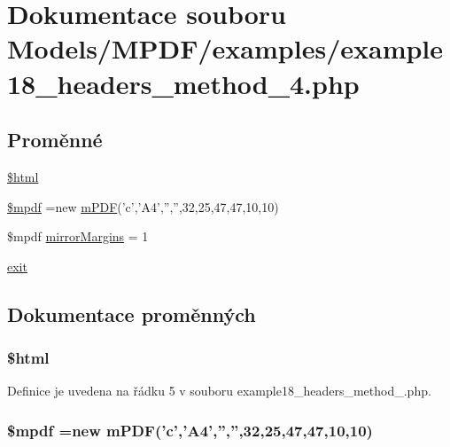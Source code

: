 \hypertarget{example18__headers__method__4_8php}{\section{Dokumentace souboru Models/\-M\-P\-D\-F/examples/example18\-\_\-headers\-\_\-method\-\_\-4.php}
\label{example18__headers__method__4_8php}
}
\subsection*{Proměnné}
\begin{DoxyCompactItemize}
\item 
\hyperlink{example18__headers__method__4_8php_a6f96e7fc92441776c9d1cd3386663b40}{\$html}
\item 
\hyperlink{example18__headers__method__4_8php_ad028f81910d6cbab9b184d2214b3a8f8}{\$mpdf} =new \hyperlink{classm_p_d_f}{m\-P\-D\-F}('c','A4','','',32,25,47,47,10,10)
\item 
\$mpdf \hyperlink{example18__headers__method__4_8php_a24c284cb7774410f65953584ea1fd9c1}{mirror\-Margins} = 1
\item 
\hyperlink{example18__headers__method__4_8php_a6733eb5f605d09eaede9845835d71c4e}{exit}
\end{DoxyCompactItemize}


\subsection{Dokumentace proměnných}
\hypertarget{example18__headers__method__4_8php_a6f96e7fc92441776c9d1cd3386663b40}{
\subsubsection[{\$html}]{\setlength{\rightskip}{0pt plus 5cm}\$html}}\label{example18__headers__method__4_8php_a6f96e7fc92441776c9d1cd3386663b40}


Definice je uvedena na řádku 5 v souboru example18\-\_\-headers\-\_\-method\-\_.\-php.

\hypertarget{example18__headers__method__4_8php_ad028f81910d6cbab9b184d2214b3a8f8}{
\subsubsection[{\$mpdf}]{\setlength{\rightskip}{0pt plus 5cm}\$mpdf =new {\bf m\-P\-D\-F}('c','A4','','',32,25,47,47,10,10)}}\label{example18__headers__method__4_8php_ad028f81910d6cbab9b184d2214b3a8f8}


